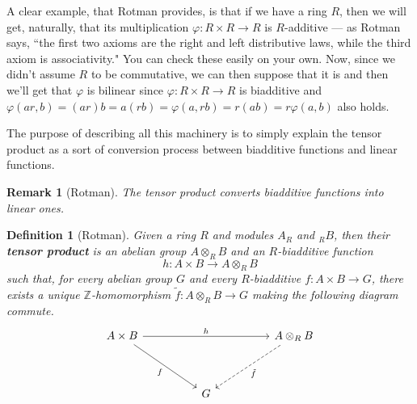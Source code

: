 \documentclass[12pt,reqno]{amsart}
\theoremstyle{plain}
\newtheorem{defi}{Definition}
\newtheorem{rem}{Remark}
\newcommand{\zz}{\mathbb Z}
\begin{document}
A clear example, that Rotman provides,  is that if we have a ring $R$, then we will get, naturally, that its multiplication $\varphi \colon R \times R \to R$ is $R$-additive — as Rotman says, ``the first two axioms are the right and left distributive laws, while the third axiom is associativity." You can check these easily on your own.  Now, since we didn't assume $R$ to be commutative, we can then suppose that it is and then we'll get that $\varphi$ is bilinear since $\varphi \colon R \times R \to R$ is biadditive and $\varphi (ar, b) = (ar)b= a(rb) = \varphi (a, rb) = r(ab) = r \varphi (a, b)$ also holds. 

The purpose of describing all this machinery is to simply explain the tensor product as a sort of conversion process between biadditive functions and linear functions.
\begin{rem}[Rotman]The tensor product converts biadditive functions into linear ones. 
\end{rem} 
\begin{defi}[Rotman] Given a ring $R$ and modules $A_R$ and $_R B$, then their \textbf{tensor product}  is an abelian group $A \otimes_R B$ and an $R$-biadditive function
$$ h \colon A \times B \to A \otimes_R B$$ such that, for every abelian group $G$ and every $R$-biadditive $f \colon A \times B \to G$, there exists a unique $\zz$-homomorphism $\tilde{f} \colon A \otimes_R B \to G$ making the following diagram commute. 
$$\begin{tikzcd}
A \times B \arrow[rrrr, "h"] \arrow[rrdd, "f"'] &  &   &  & A \otimes_R B \arrow[lldd, "\tilde{f}", dashed] \\
                                       &  &   &  &                             \\
                                       &  & G &  &                            
\end{tikzcd}$$
\end{defi} 
\end{document}
